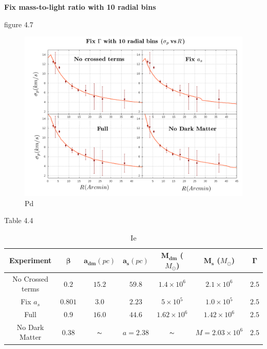 \textbf{Fix mass-to-light ratio with 10 radial bins}

figure 4.7

\begin{figure}[H]
\centering
\includegraphics[width=15cm]{images/fix_gamma_refinado_10.png}
\caption[Pg]{Pd}
\end{figure}

Table 4.4

\begin{table}[H]
\begin{center}
\begin{tabular}{| c| c| c| c| c| c| c|}
    \hline
    \textbf{Experiment} & $\mathbf{\beta}$ & $\mathbf{a_{dm}} (pc)$ & $\mathbf{a_{s}} (pc)$ & $\mathbf{M_{dm}}$ ($M_{\odot}$) & $\mathbf{M_{s}}$ ($M_{\odot}$) & $\mathbf{\Gamma}$\\ \hline
	No Crossed terms & $0.2$ &	$15.2$ &	$59.8$ &	$1.4 \times 10^{6}$ &	$2.1 \times 10^{6}$ &	$2.5$\\ \hline
	Fix $a_s$ &	$0.801$ &	$3.0$ &	$2.23$ &	$5 \times 10^{5}$ &	$1.0 \times 10 ^{5}$ &	$2.5$\\ \hline
	Full &	$0.9$ &	$16.0$ &	$44.6$ &	$1.62 \times 10^{6}$ &	$1.42 \times 10^{6}$ &	$2.5$\\ \hline
	No Dark Matter &	$0.38$ &	$\thicksim$ & $ a = 2.38$ &	$\thicksim$ & $  M = 2.03 \times 10^{6}$ & 	$2.5$\\
    \hline
  \end{tabular} 
\caption[It]{Ie}
\end{center}
  
\end{table}


